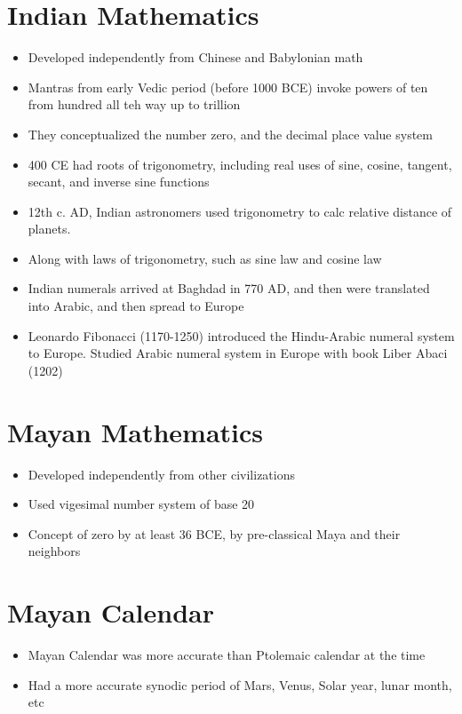 \documentclass{article}
\begin{document}
\section*{Indian Mathematics}
\begin{itemize}
  \item Developed independently from Chinese and Babylonian math
  \item Mantras from early Vedic period (before 1000 BCE) invoke powers of ten
    from hundred all teh way up to trillion
  \item They conceptualized the number zero, and the decimal place value system
  \item 400 CE had roots of trigonometry, including real uses of
    sine, cosine, tangent, secant, and inverse sine functions
  \item 12th c. AD, Indian astronomers used trigonometry to calc relative distance of planets.
  \item Along with laws of trigonometry, such as sine law and cosine law
  \item Indian numerals arrived at Baghdad in 770 AD, and then
    were translated into Arabic, and then spread to Europe
  \item Leonardo Fibonacci (1170-1250) introduced the Hindu-Arabic numeral system to Europe.
    Studied Arabic numeral system in Europe with book Liber Abaci (1202)
\end{itemize}

\section*{Mayan Mathematics}
\begin{itemize}
  \item Developed independently from other civilizations
  \item Used vigesimal number system of base 20
  \item Concept of zero by at least 36 BCE,
    by pre-classical Maya and their neighbors
\end{itemize}

\section*{Mayan Calendar}
\begin{itemize}
  \item Mayan Calendar was more accurate than Ptolemaic calendar at the time
  \item Had a more accurate synodic period of Mars, Venus, Solar year, lunar month, etc
\end{itemize}
\end{document}
